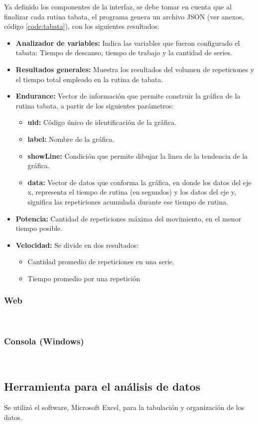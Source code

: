Ya definido los componentes de la interfaz, se debe tomar en cuenta que al finalizar cada rutina tabata, el programa genera un archivo JSON (ver anexos, c\'odigo  \ref{code:tabata}), con los siguientes resultados:
\begin{itemize}
	\item \textbf{Analizador de variables:} Indica las variables que fueron configurado el tabata: Tiempo de descanso, tiempo de trabajo y la cantidad de series.
	\item  \textbf{Resultados generales:} Muestra los resultados del volumen de repeticiones  y el tiempo total empleado en la rutina de tabata.
	\item  \textbf{Endurance:} Vector de informaci\'on que permite construir la gr\'afica de la rutina tabata, a partir de los siguientes par\'ametros:
	   \begin{itemize}  
   	\item \textbf{uid:} C\'odigo \'unico de identificaci\'on de la gr\'afica.
   	\item \textbf{label:} Nombre de la gr\'afica.
   	\item \textbf{showLine:} Condici\'on que permite dibujar la linea de la tendencia de la gr\'afica.
    \item \textbf{data:} Vector de datos que conforma la gr\'afica, en donde los datos del eje x, representa el tiempo de rutina (en segundos) y los datos del eje y, significa las repeticiones acumulada durante ese tiempo de rutina.
   \end{itemize}     
    \item \textbf{Potencia:} Cantidad de repeticiones m\'axima del movimiento, en el menor tiempo posible.
    \item \textbf{Velocidad:} Se divide en dos resultados:
           \begin{itemize}
       \item Cantidad promedio de repeticiones en una serie.
       \item Tiempo promedio por una repetici\'on
       \end{itemize}
\end{itemize} 
\subsubsection{Web}\mbox{} \\
\subsubsection{Consola (Windows)}\mbox{} \\

\subsection{Herramienta para el an\'alisis de datos} \label{ins:toolsAn}
Se utiliz\'o el software, Microsoft Excel, para la tabulaci\'on y organizaci\'on de los datos.